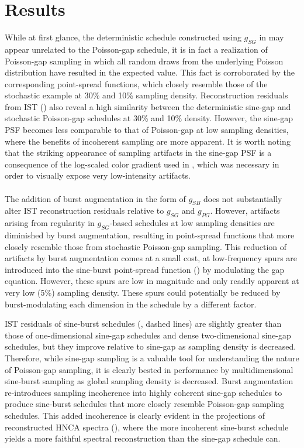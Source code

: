 \section{Results}

\begin{doublespace}
While at first glance, the deterministic schedule constructed using $g_{SG}$
in  may appear unrelated to the Poisson-gap
schedule, it is in fact a realization of Poisson-gap sampling in which all
random draws from the underlying Poisson distribution have resulted in the
expected value. This fact is corroborated by the corresponding point-spread
functions, which closely resemble those of the stochastic example at 30\% and
10\% sampling density. Reconstruction residuals from IST
() also reveal a high similarity between the
deterministic sine-gap and stochastic Poisson-gap schedules
at 30\% and 10\% density. However, the sine-gap PSF becomes less
comparable to that of Poisson-gap at low sampling densities, where the
benefits of incoherent sampling are more apparent. It is worth noting
that the striking appearance of sampling artifacts in the sine-gap PSF is a
consequence of the log-scaled color gradient used in ,
which was necessary in order to visually expose very low-intensity artifacts.
\\\\
The addition of burst augmentation in the form of $g_{SB}$ does not
substantially alter IST reconstruction residuals relative to $g_{SG}$ and
$g_{PG}$. However, artifacts arising from regularity in $g_{SG}$-based
schedules at low sampling densities are diminished by burst augmentation,
resulting in point-spread functions that more closely resemble those from
stochastic Poisson-gap sampling. This reduction of artifacts by burst
augmentation comes at a small cost, at low-frequency spurs are introduced
into the sine-burst point-spread function () by
modulating the gap equation. However, these spurs are low in magnitude and
only readily apparent at very low (5\%) sampling density. These spurs could
potentially be reduced by burst-modulating each dimension in the schedule
by a different factor.

IST residuals of sine-burst schedules (, dashed lines)
are slightly greater than those of one-dimensional sine-gap schedules and dense
two-dimensional sine-gap schedules, but they improve relative to sine-gap as
sampling density is decreased. Therefore, while sine-gap sampling is a valuable
tool for understanding the nature of Poisson-gap sampling, it is clearly bested
in performance by multidimensional sine-burst sampling as global sampling
density is decreased. Burst augmentation re-introduces sampling incoherence
into highly coherent sine-gap schedules to produce sine-burst schedules that
more closely resemble Poisson-gap sampling schedules. This added incoherence
is clearly evident in the \hcnmr{} projections of reconstructed HNCA spectra
(), where the more incoherent sine-burst schedule
yields a more faithful spectral reconstruction than the sine-gap schedule
can.
\end{doublespace}

